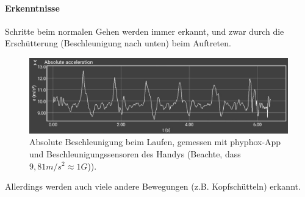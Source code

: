 \documentclass[a4paper,12pt]{article}
\begin{document}
\paragraph{Erkenntnisse}
Schritte beim normalen Gehen werden immer erkannt, und zwar durch die Erschütterung (Beschleunigung nach unten) beim Auftreten. 
\begin{figure}
	\centering
\includegraphics[width = 14cm]{bilder/steps.jpg}
	\caption{Absolute Beschleunigung beim Laufen, gemessen mit phyphox-App und Beschleunigungssensoren des Handys  (Beachte, dass $9,81 m/s^2 \approx 1 G$)).}
\end{figure} 
Allerdings werden auch viele andere Bewegungen (z.B. Kopfschütteln) erkannt.
\end{document}
